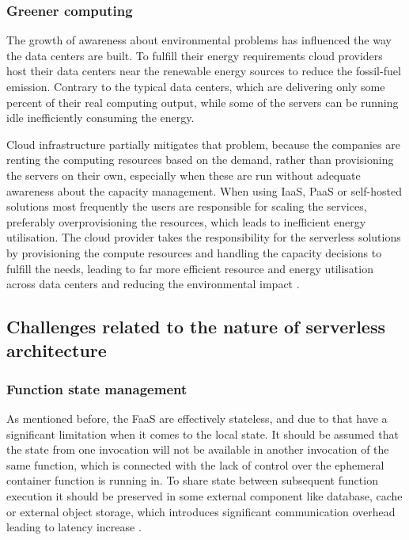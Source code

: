 \subsubsection*{Greener computing}

The growth of awareness about environmental problems has influenced the way the data centers are built. To fulfill their energy requirements cloud providers host their data centers near the renewable energy sources to reduce the fossil-fuel emission. Contrary to the typical data centers, which are delivering only some percent of their real computing output, while some of the servers can be running idle inefficiently consuming the energy.

Cloud infrastructure partially mitigates that problem, because the companies are renting the computing resources based on the demand, rather than provisioning the servers on their own, especially when these are run without adequate awareness about the capacity management. When using IaaS, PaaS or self-hosted solutions most frequently the users are responsible for scaling the services, preferably overprovisioning the resources, which leads  to inefficient energy utilisation. The cloud provider takes the responsibility for the serverless solutions by provisioning the compute resources and handling the capacity decisions to fulfill the needs, leading to far more efficient resource and energy utilisation across data centers and reducing the environmental impact \cite{MartinFowlerServerless}.

\subsection{Challenges related to the nature of serverless architecture}

\subsubsection*{Function state management}

As mentioned before, the FaaS are effectively stateless, and due to that have a significant limitation when it comes to the local state. It should be assumed that the state from one invocation will not be available in another invocation of the same function, which is connected with the lack of control over the ephemeral container function is running in. To share state between subsequent function execution it should be preserved in some external component like database, cache or external object storage, which introduces significant communication overhead leading to latency increase \cite{MartinFowlerServerless}.

